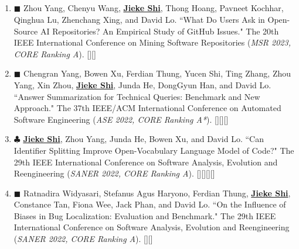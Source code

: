 \documentclass{resume}
\begin{document}
\subsection*{\textcolor{accentcolor}{}}
    \begin{enumerate}[itemsep=0.1cm]
      \item[\bracketlabel{C4}] $\mdblksquare$ Zhou Yang, Chenyu Wang, \underline{\bf{Jieke Shi}}, Thong Hoang, Pavneet Kochhar, Qinghua Lu, Zhenchang Xing, and David Lo. ``What Do Users Ask in Open-Source AI Repositories? An Empirical Study of GitHub Issues." {\itfont The 20th IEEE International Conference on Mining Software Repositories (}{\it MSR 2023, CORE Ranking A}{\itfont )}. [][]
      \item[\bracketlabel{C3}] $\mdblksquare$ Chengran Yang, Bowen Xu, Ferdian Thung, Yucen Shi, Ting Zhang, Zhou Yang, Xin Zhou, \underline{\bf{Jieke Shi}}, Junda He, DongGyun Han, and David Lo. ``Answer Summarization for Technical Queries: Benchmark and New Approach." {\itfont The 37th IEEE/ACM International Conference on Automated Software Engineering (}{\it ASE 2022, CORE Ranking A*}{\itfont )}. [][][]
      
      \item[\bracketlabel{S3}] $\clubsuit$ \underline{\bf{Jieke Shi}}, Zhou Yang, Junda He, Bowen Xu, and David Lo. ``Can Identifier Splitting Improve Open-Vocabulary Language Model of Code?" {\itfont The 29th IEEE International Conference on Software Analysis, Evolution and Reengineering (}{\it SANER 2022, CORE Ranking A}{\itfont )}. [][][][]
      
      \item[\bracketlabel{C2}] $\mdblksquare$ Ratnadira Widyasari, Stefanus Agus Haryono, Ferdian Thung, \underline{\bf{Jieke Shi}}, Constance Tan, Fiona Wee, Jack Phan, and David Lo. ``On the Influence of Biases in Bug Localization: Evaluation and Benchmark." {\itfont The 29th IEEE International Conference on Software Analysis, Evolution and Reengineering (}{\it SANER 2022, CORE Ranking A}{\itfont )}. [][]
      

\end{enumerate}
\end{document}
